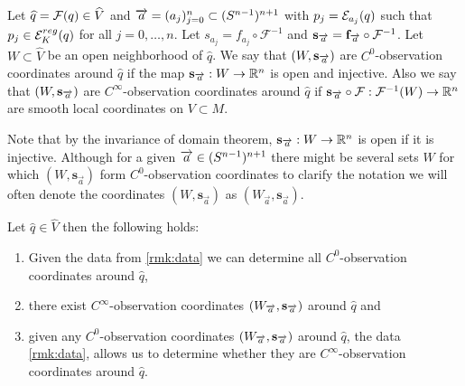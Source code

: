 \begin{definition}
Let $\widehat{q}=\F(q)\in \widehat{V}$ and $\aa = (a_j)^n_{j=0}\subset (\sn)^{n+1}$ with $p_j = \mc{E}_{a_j}(q)$ such that $p_j\in \er(q)$ for all $j=0,\dots,n$. Let $s_{a_j} = f_{a_j} \circ \mathcal{F}^{-1}$ and $\mathbf{s}_{\overrightarrow{a}}=\mathbf{f}_{\overrightarrow{a}}\circ\mc{F}^{-1}$. Let $W\subset\widehat{V}$ be an open neighborhood of $\widehat{q}$. We say that $(W,\mathbf{s}_\aa)$ are $C^0$-observation coordinates around $\widehat{q}$ if the map $\mathbf{s}_\aa:W\to \R^n$ is open and injective. Also we say that $(W,\mathbf{s}_\aa)$ are $C^\infty$-observation coordinates around $\widehat{q}$ if $\mathbf{s}_{\overrightarrow{a}}\circ\mc{F}:\mc{F}^{-1}(W)\to \R^n$ are smooth local coordinates on $V\subset M$.
\end{definition}
Note that by the invariance of domain theorem, $\mathbf{s}_{\overrightarrow{a}}:W\to \R^n$ is open if it is injective.
Although for a given $\overrightarrow{a}\in (\sn)^{n+1}$ there might be several sets $W$ for which $(W,\mathbf{s}_{\overrightarrow{a}})$ form $C^0$-observation coordinates to clarify the notation we will often denote the coordinates $(W,\mathbf{s}_{\overrightarrow{a}})$ as $(W_{\overrightarrow{a}},\mathbf{s}_{\overrightarrow{a}})$. 

\begin{proposition}\label{prop:findsmoothcoords}
Let  $\widehat{q}\in \widehat{V}$ then the following holds:
\begin{enumerate}[label={\textnormal{(\arabic*)}}]
    \item Given the data from \ref{rmk:data} we can determine all $C^0$-observation coordinates around $\widehat{q}$,
    \item there exist $C^\infty$-observation coordinates $(W_\aa,\mathbf{s}_\aa)$ around $\widehat{q}$ and
    \item given any $C^0$-observation coordinates $(W_\aa,\mathbf{s}_\aa)$ around $\widehat{q}$, the data \ref{rmk:data}, allows us to determine whether they are $C^\infty$-observation coordinates around $\widehat{q}$.
\end{enumerate}
\end{proposition}

